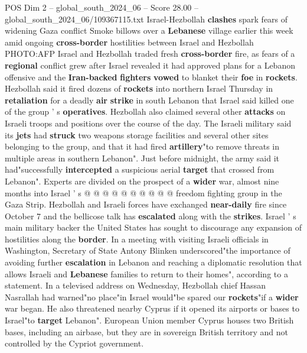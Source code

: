 \begin{textsample}{POS Dim 2 – global\_south\_2024\_06 – Score 28.00 – global\_south\_2024\_06/109367115.txt}  \label{ex:f2_pos_111}
Israel-Hezbollah \textbf{clashes} spark fears of widening Gaza conflict Smoke billows over a \textbf{Lebanese} village earlier this week amid ongoing \textbf{cross-border} hostilities between Israel and Hezbollah PHOTO:AFP Israel and Hezbollah traded fresh \textbf{cross-border} fire, as fears of a \textbf{regional} conflict grew after Israel revealed it had approved plans for a Lebanon offensive and the \textbf{Iran-backed} \textbf{fighters} \textbf{vowed} to blanket their \textbf{foe} in \textbf{rockets}.
Hezbollah said it fired dozens of \textbf{rockets} into northern Israel Thursday in \textbf{retaliation} for a deadly \textbf{air} \textbf{strike} in south Lebanon that Israel said killed one of the group ' s \textbf{operatives}.
Hezbollah also claimed several other \textbf{attacks} on Israeli troops and positions over the course of the day.
The Israeli military said its \textbf{jets} had \textbf{struck} two weapons storage facilities and several other sites belonging to the group, and that it had fired \textbf{artillery}"to remove threats in multiple areas in southern Lebanon".
Just before midnight, the army said it had"successfully \textbf{intercepted} a suspicious aerial \textbf{target} that crossed from Lebanon".
Experts are divided on the prospect of a \textbf{wider} war, almost nine months into Israel ' s @ @ @ @ @ @ @ @ @ @ freedom fighting group in the Gaza Strip.
Hezbollah and Israeli forces have exchanged \textbf{near-daily} fire since October 7 and the bellicose talk has \textbf{escalated} along with the \textbf{strikes}.
Israel ' s main military backer the United States has sought to discourage any expansion of hostilities along the \textbf{border}.
In a meeting with visiting Israeli officials in Washington, Secretary of State Antony Blinken underscored"the importance of avoiding further \textbf{escalation} in Lebanon and reaching a diplomatic resolution that allows Israeli and \textbf{Lebanese} families to return to their homes", according to a statement.
In a televised address on Wednesday, Hezbollah chief Hassan Nasrallah had warned"no place"in Israel would"be spared our \textbf{rockets}"if a \textbf{wider} war began.
He also threatened nearby Cyprus if it opened its airports or bases to Israel"to \textbf{target} Lebanon".
European Union member Cyprus houses two British bases, including an airbase, but they are in sovereign British territory and not controlled by the Cypriot government.

\end{textsample}
